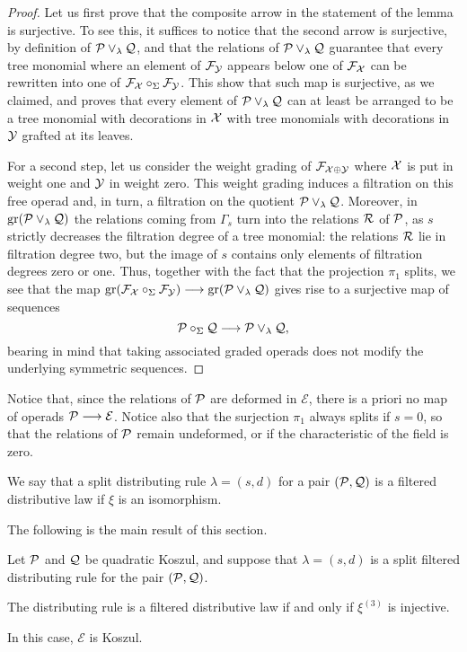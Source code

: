 \begin{proof}
Let us first prove that the composite arrow 
in the statement of the lemma is surjective. 
To see this, it suffices to notice that
the second arrow is surjective, by
definition of ${\mathcal{P}}\vee_\lambda \mathcal{Q}$, and that
the relations of ${\mathcal{P}}\vee_\lambda \mathcal{Q}$ guarantee
that every tree monomial where an element
of $\mathcal{F}_{\mathcal{Y}}$ appears below one of 
$\mathcal{F}_{\mathcal{X}}$ can be rewritten into one
of $\mathcal{F}_{\mathcal{X}}\circ_\Sigma\mathcal{F}_{\mathcal{Y}}$.
This show that such map is surjective,
as we claimed, and proves that every element of
${\mathcal{P}}\vee_\lambda \mathcal{Q}$ can at least be arranged to be
a tree monomial with decorations in $\mathcal{X}$
with tree monomials with decorations in $\mathcal{Y}$
grafted at its leaves.

For a second step, let us consider the
weight grading of $\mathcal{F}_{\mathcal{X}\oplus\mathcal{Y}}$
where $\mathcal{X}$ is put in weight one and
$\mathcal{Y}$ in weight zero. This weight
grading induces a filtration on this free
operad and, in turn, a filtration on the
quotient ${\mathcal{P}}\vee_\lambda \mathcal{Q}$. 
Moreover, in $\mathrm{gr}({\mathcal{P}}\vee_\lambda \mathcal{Q})$
the relations coming from $\Gamma_s$ turn
into the relations $\mathcal{R}$ of ${\mathcal{P}}$, as
$s$ strictly decreases the filtration 
degree of a tree monomial: the relations
$\mathcal{R}$ lie in filtration degree two,
but the image of $s$ contains only elements
of filtration degrees zero or one. 
Thus, together with the fact that the
projection $\pi_1$ splits, we see
that the map
$\mathrm{gr}(\mathcal{F}_{\mathcal{X}}\circ_\Sigma\mathcal{F}_{\mathcal{Y}})
\longrightarrow
\mathrm{gr}({\mathcal{P}}\vee_\lambda \mathcal{Q})$
gives rise to a surjective map of sequences
\[
{\mathcal{P}}\circ_\Sigma\mathcal{Q}
\longrightarrow
{\mathcal{P}}\vee_\lambda \mathcal{Q},
\]
bearing in mind that taking associated
graded operads does not modify the 
underlying symmetric sequences.
\end{proof}

Notice that, since the relations
of ${\mathcal{P}}$ are deformed in $\mathcal E$,
there is a priori no map of operads
${\mathcal{P}}\longrightarrow \mathcal E$. Notice
also that the surjection $\pi_1$ always
splits if $s=0$, so that the relations of
${\mathcal{P}}$ remain undeformed, or if the
characteristic of the field is zero. 

\begin{definition}
We say that a split distributing rule
$\lambda = (s,d)$ 
for a pair $({\mathcal{P}},\mathcal{Q})$  is a 
filtered distributive law if $\xi$ is
an isomorphism. 
\end{definition}

The following is the main result of this
section.

\begin{theorem} Let ${\mathcal{P}}$ and $\mathcal{Q}$ be quadratic
Koszul, and suppose that $\lambda = (s,d)$ is a split filtered distributing rule for the pair
$({\mathcal{P}},\mathcal{Q})$. 
\begin{tenumerate}
\item The distributing rule is a filtered
distributive law if and only if $\xi^{(3)}$
is injective.
\item In this case, $\mathcal E$ is Koszul. 
\end{tenumerate}
\end{theorem}

